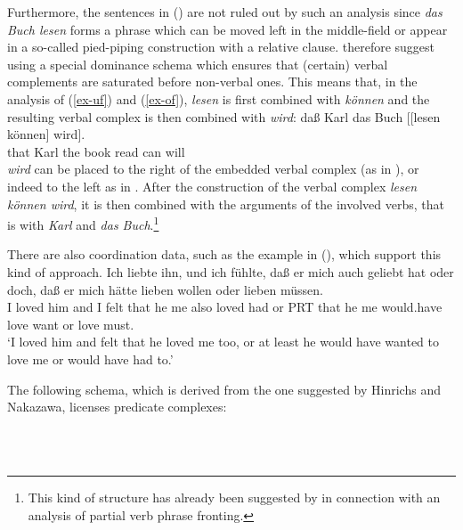 Furthermore, the sentences in () are not ruled out by such an analysis since \emph{das Buch lesen} 
forms a phrase which can be moved left in the middle-field or appear in a so-called pied-piping construction 
with a relative clause.
\eal
{}
\zl
%
\citet*{HN94a} therefore suggest using a special dominance schema which ensures that
(certain) verbal complements are saturated before non-verbal ones. This means that, in the analysis of (\ref{ex-uf}) and (\ref{ex-of}),
\emph{lesen} is first combined with \emph{können} and the resulting verbal complex is then combined with \emph{wird}:
\ea
\gll daß Karl das Buch [[lesen können] wird].\\
     that Karl the book \hspaceThis{[[}read can will\\
\z
\emph{wird} can be placed to the right of the embedded verbal complex (as in ), or indeed to the left as
in . After the construction of the verbal complex \emph{lesen können wird}, it is then combined with the 
arguments of the involved verbs, that is with \emph{Karl} and \emph{das Buch}.\footnote{%
		This kind of structure has already been suggested 
		by \citet*{Johnson86a} in connection with an analysis of partial verb phrase fronting.
}

There are also coordination data, such as the example in (), which support this kind of approach.
\ea
\gll Ich liebte ihn, und ich fühlte, daß er mich auch geliebt hat oder doch, daß er mich hätte lieben wollen oder lieben müssen.\footnotemark\\
     I   loved  him and I felt that he me also loved had or PRT that he me   would.have love want or love must.\\
\glt `I loved him and felt that he loved me too, or at least he would have wanted to love me or would have had to.'
\z

The following schema, which is derived from the one suggested by Hinrichs and Nakazawa, licenses
predicate complexes:

\begin{samepage}
\begin{schema}
\label{schema-vk}
~\\
 \impl\\
\end{schema}
\end{samepage}
%

